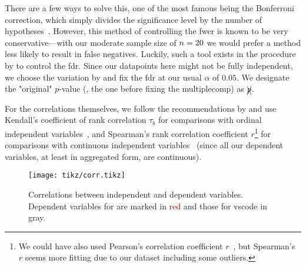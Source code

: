 \documentclass[../thesis]{subfiles}
\begin{document}
There are a few ways to solve this, one of the most famous being the Bonferroni correction, which simply divides the significance level by the number of hypotheses~\cite[66 \psq]{miller1981}.
However, this method of controlling the \gls{fwer} is known to be very conservative---with our moderate sample size of $n=20$ we would prefer a method less likely to result in false negatives.
Luckily, such a tool exists in the procedure by \textcite{benjamini1995} to control the \gls{fdr}.
Since our datapoints here might not be fully independent, we choose the variation by \textcite{benjamini2001} and fix the \gls{fdr} at our usual $\alpha$ of $0.05$.
We designate the "original" $p$-value (\ie, the one before fixing the \gls{multiplecomp}) as $\xcancel{p}$.

For the correlations themselves, we follow the recommendations by \textcite[157,159]{khamis2008} and use Kendall's coefficient of rank correlation $\tau_b$ for comparisons with ordinal independent variables~\cite{kendall1938, kendall1945}, and Spearman's rank correlation coefficient $r$\footnote{
	We could have also used Pearson's correlation coefficient $r$~\cite{bravais1844, pearson1895}, but Spearman's $r$ seems more fitting due to our dataset including some outliers.
} for comparisons with continuous independent variables~\cite{spearman1904} (since all our dependent variables, at least in aggregated form, are continuous).

\begin{figure}
	\centering
	\texttt{[image: tikz/corr.tikz]}
	\caption{Correlations between independent and dependent variables.\\
		Dependent variables for \SEE{} are marked in \textcolor{Maroon}{red} and those for \gls{vscode} in \textcolor{Gray!50!black}{gray}.}\label{fig:corr}
\end{figure}
\end{document}

